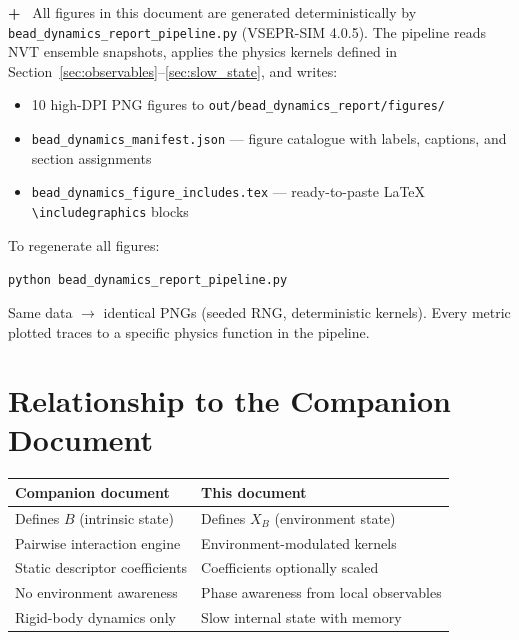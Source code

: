 \documentclass[11pt]{article}
\newcommand{\vsadd}[1]{\textcolor{vsgreen}{\textbf{+}~#1}}
\begin{document}
\vsadd{%
All figures in this document are generated deterministically by
\texttt{bead\_dynamics\_report\_pipeline.py} (VSEPR-SIM 4.0.5).  The
pipeline reads NVT ensemble snapshots, applies the physics kernels defined
in Section~\ref{sec:observables}--\ref{sec:slow_state}, and writes:
\begin{itemize}
  \item 10 high-DPI PNG figures to \texttt{out/bead\_dynamics\_report/figures/}
  \item \texttt{bead\_dynamics\_manifest.json} --- figure catalogue with
		labels, captions, and section assignments
  \item \texttt{bead\_dynamics\_figure\_includes.tex} --- ready-to-paste
		LaTeX \texttt{\textbackslash includegraphics} blocks
\end{itemize}

\noindent
To regenerate all figures:
\begin{center}
  \texttt{python bead\_dynamics\_report\_pipeline.py}
\end{center}

\noindent
Same data $\to$ identical PNGs (seeded RNG, deterministic kernels).
Every metric plotted traces to a specific physics function in the pipeline.
}

\section{Relationship to the Companion Document}

\begin{center}
\begin{tabular}{ll}
  \toprule
  \textbf{Companion document} & \textbf{This document} \\
  \midrule
  Defines $B$ (intrinsic state)           & Defines $X_B$ (environment state) \\
  Pairwise interaction engine             & Environment-modulated kernels \\
  Static descriptor coefficients         & Coefficients optionally scaled \\
  No environment awareness               & Phase awareness from local observables \\
  Rigid-body dynamics only               & Slow internal state with memory \\
  \bottomrule
\end{tabular}
\end{center}
\end{document}
